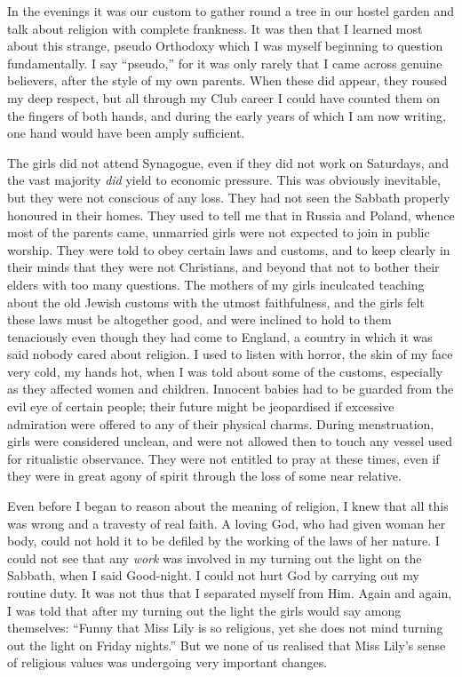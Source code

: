 In the evenings it was our custom to gather round a
tree in our hostel garden and talk about religion with
complete frankness. It was then that I learned most
about this strange, pseudo Orthodoxy which I was myself
beginning to question fundamentally. I say “pseudo,”
for it was only rarely that I came across genuine
believers, after the style of my own parents. When these
did appear, they roused my deep respect, but all through
my Club career I could have counted them on the fingers
of both hands, and during the early years of which I am
now writing, one hand would have been amply sufficient.

The girls did not attend Synagogue, even if they did
not work on Saturdays, and the vast majority \textsl{did} yield
to economic pressure. This was obviously inevitable,
but they were not conscious of any loss. They had not
seen the Sabbath properly honoured in their homes.
They used to tell me that in Russia and Poland, whence
most of the parents came, unmarried girls were not
expected to join in public worship. They were told to
obey certain laws and customs, and to keep clearly in
their minds that they were not Christians, and beyond
that not to bother their elders with too many questions.
The mothers of my girls inculcated teaching about the
old Jewish customs with the utmost faithfulness, and the
girls felt these laws must be altogether good, and were
inclined to hold to them tenaciously even though they
had come to England, a country in which it was said
nobody cared about religion. I used to listen with
horror, the skin of my face very cold, my hands hot,
when I was told about some of the customs, especially as
they affected women and children. Innocent babies had
to be guarded from the evil eye of certain people; their
future might be jeopardised if excessive admiration
were offered to any of their physical charms. During
menstruation, girls were considered unclean, and
were not allowed then to touch any vessel used for
ritualistic observance. They were not entitled to pray
at these times, even if they were in great agony of spirit
through the loss of some near relative.

Even before I began to reason about the meaning of
religion, I knew that all this was wrong and a travesty
of real faith. A loving God, who had given woman her
body, could not hold it to be defiled by the working of
the laws of her nature. I could not see that any \textsl{work} was
involved in my turning out the light on the Sabbath,
when I said Good-night. I could not hurt God by
carrying out my routine duty. It was not thus that I
separated myself from Him. Again and again, I was
told that after my turning out the light the girls would
say among themselves: “Funny that Miss Lily is so
religious, yet she does not mind turning out the light on
Friday nights.” But we none of us realised that Miss
Lily’s sense of religious values was undergoing very
important changes.

